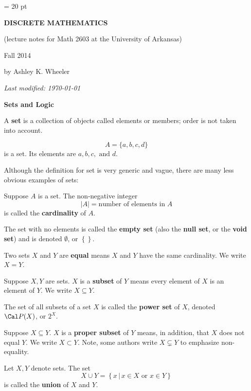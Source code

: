 

{}
\nologo         
\parindent = 20 pt
\centerline{\bf DISCRETE MATHEMATICS }\hfill\break
\centerline{(lecture notes for Math 2603 at the University of Arkansas)}\hfill
\centerline{Fall 2014}\hfill
\centerline{by Ashley K. Wheeler}\hfill
\centerline{\it Last modified: \today}\hfill

\bigskip
\centerline{\bf Sets and Logic}
\medskip

 A {\bf set} is a collection of objects called elements or members; order is not taken into account. \endproclaim

\ex $$A=\{a,b,c,d\}$$
is a set.  Its elements are $a,b,c,\text{ and }d$.\endex

Although the definition for set is very generic and vague, there are many less obvious examples of sets:

\ex \endex

 Suppose $A$ is a set.  The non-negative integer 
$$|A|=\text{number of elements in $A$}$$ 
is called the {\bf cardinality} of $A$. \endproclaim

 The set with no elements is called the {\bf empty set} (also the {\bf null set}, or the {\bf void set}) and is denoted $\emptyset$, or $\left\{\right\}$. \endproclaim

 Two sets $X$ and $Y$ are {\bf equal} means $X$ and $Y$ have the same cardinality.  We write $X=Y$. \endproclaim

 Suppose $X,Y$ are sets.  $X$ is a {\bf subset} of $Y$ means every element of $X$ is an element of $Y$.  We write $X\subseteq Y$. \endproclaim

 The set of all subsets of a set $X$ is called the {\bf power set} of $X$, denoted $\Cal P(X)$, or $2^X$. \endproclaim

 Suppose $X\subseteq Y$.  $X$ is a {\bf proper subset} of $Y$ means, in addition, that $X$ does not equal $Y$.  We write $X\subset Y$.  Note, some authors write $X\subsetneq Y$ to emphasize non-equality. \endproclaim

 Let $X,Y$ denote sets.  The set
$$X\cup Y=\left\{x\,|\,x\in X\text{ or }x\in Y\right\}$$
is called the {\bf union} of $X$ and $Y$. \endproclaim

